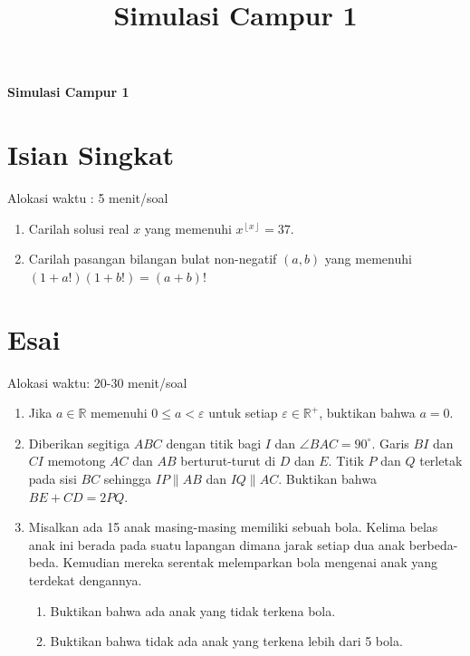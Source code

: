 \documentclass[12pt]{scrartcl}
\title{Simulasi Campur 1}
\begin{document}
\renewcommand*\contentsname{Daftar Isi}
\tableofcontents

\newpage
\textbf{\Large Simulasi Campur 1}
	
\section{Isian Singkat}
Alokasi waktu : 5 menit/soal

\begin{enumerate}
	\item Carilah solusi real $x$ yang memenuhi $x^{\left \lfloor x \right \rfloor} = 37.$
	
	\item Carilah pasangan bilangan bulat non-negatif $(a,b)$ yang memenuhi $(1+a!)(1+b!)=(a+b)!$

\end{enumerate}

\section{Esai}
Alokasi waktu: 20-30 menit/soal
\begin{enumerate}[resume]
	\item Jika $a \in \mathbb{R}$ memenuhi $0 \le a < \varepsilon$ untuk setiap $\varepsilon \in \mathbb{R^+}$, buktikan bahwa $a = 0.$
	
	\item Diberikan segitiga $ABC$ dengan titik bagi $I$ dan $\angle BAC = 90^\circ$. Garis $BI$ dan $CI$ memotong $AC$ dan $AB$ berturut-turut di $D$ dan $E$. Titik $P$ dan $Q$ terletak pada sisi $BC$ sehingga $IP \parallel AB$ dan $IQ \parallel AC$. Buktikan bahwa $BE+CD=2PQ$.
	
	\item Misalkan ada 15 anak masing-masing memiliki sebuah bola. Kelima belas anak ini berada pada suatu lapangan dimana jarak setiap dua anak berbeda-beda. Kemudian mereka serentak melemparkan bola mengenai anak yang terdekat dengannya. 
	\begin{enumerate}
		\item Buktikan bahwa ada anak yang tidak terkena bola.
		\item Buktikan bahwa tidak ada anak yang terkena lebih dari 5 bola.
	\end{enumerate}
	
\end{enumerate}
\end{document}
